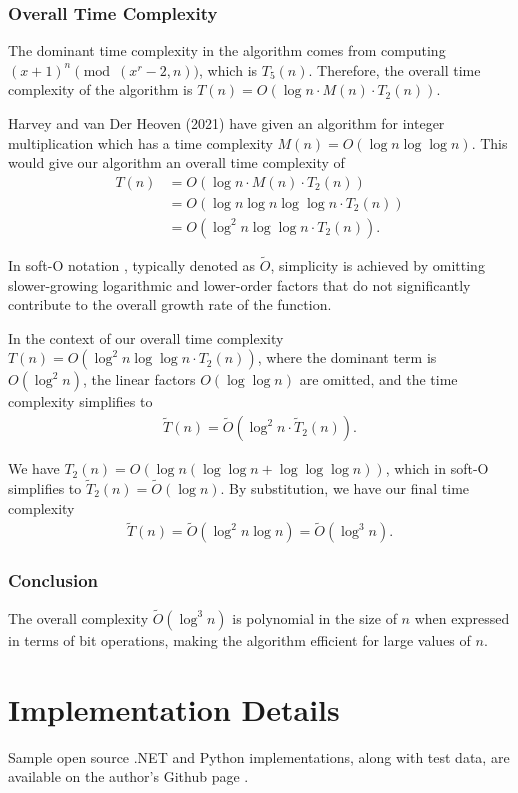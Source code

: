 \documentclass{article}
\theoremstyle{plain}
\theoremstyle{definition}
\begin{document}
\subsubsection{Overall Time Complexity}
The dominant time complexity in the algorithm comes from computing $(x+1)^n \pmod{(x^r-2,n)}$, which is $T_5(n)$. Therefore, the overall time complexity of the algorithm is $T(n) = O(\log n \cdot M(n) \cdot T_2(n))$.

Harvey and van Der Heoven (2021) \cite{harveyvanderhoeven2021} have given an algorithm for integer multiplication which has a time complexity $M(n) = O(\log n \log\log n)$. This would give our algorithm an overall time complexity of
\begin{align*}
    T(n) &= O(\log n \cdot  M(n) \cdot  T_2(n))
    \\ &= O(\log n \log n \log\log n \cdot  T_2(n))
    \\ &= O(\log^2 n \log\log n \cdot  T_2(n)) .
\end{align*}

In soft-O notation \cite{gathengerhard2013softo}, typically denoted as $\tilde{O}$, simplicity is achieved by omitting slower-growing logarithmic and lower-order factors that do not significantly contribute to the overall growth rate of the function.

In the context of our overall time complexity $T(n) = O(\log^2 n \log\log n \cdot T_2(n))$, where the dominant term is $O(\log^2 n)$, the linear factors $O(\log\log n)$ are omitted, and the time complexity simplifies to
\begin{align*}
    \tilde{T}(n) = \tilde{O}(\log^2 n \cdot \tilde{T}_2(n)) .
\end{align*}

We have $T_2(n) = O(\log n (\log \log n + \log \log \log n))$, which in soft-O simplifies to $\tilde{T}_2(n) = \tilde{O}(\log n)$. By substitution, we have our final time complexity
\begin{align*}
    \tilde{T}(n) = \tilde{O}(\log^2 n \log n) = \tilde{O}(\log^3 n) .
\end{align*}

\subsubsection{Conclusion}
The overall complexity $\tilde{O}(\log^3 n)$ is polynomial in the size of $n$ when expressed in terms of bit operations, making the algorithm efficient for large values of $n$.

\section{Implementation Details}
Sample open source .NET and Python implementations, along with test data, are available on the author's Github page \cite{githubrepo}.
\end{document}
